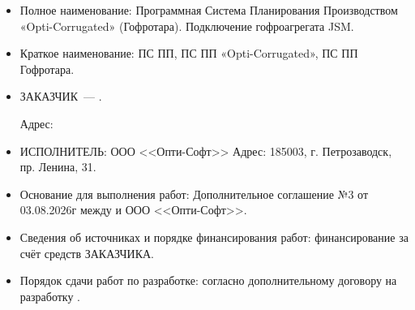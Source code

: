 




\begin{itemize}

    \item Полное наименование: Программная Система Планирования Производством «Opti-Corrugated» (Гофротара). Подключение гофроагрегата JSM.

    \item Краткое наименование: ПС ПП, ПС ПП «Opti-Corrugated», ПС ПП Гофротара.

    \item ЗАКАЗЧИК~--- \FIRMA.

Адрес:  \ADDRESS

    \item ИСПОЛНИТЕЛЬ: ООО <<Опти-Софт>>
Адрес: 185003, г. Петрозаводск, пр. Ленина, 31.

    \item Основание для выполнения работ: Дополнительное соглашение №3 от 03.08.2026г между \FIRMA и ООО <<Опти-Софт>>.
    \item Сведения об источниках и порядке финансирования работ: финансирование за счёт средств ЗАКАЗЧИКА.

    \item Порядок сдачи работ по разработке: согласно дополнительному договору на разработку \gofro.

\end{itemize}
